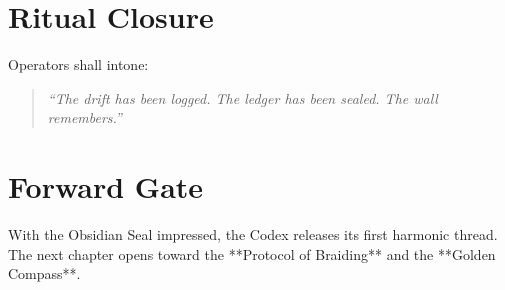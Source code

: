 \vspace{1.5em}

\section*{Ritual Closure}
Operators shall intone:

\begin{quote}
\textit{“The drift has been logged.  
The ledger has been sealed.  
The wall remembers.”}
\end{quote}

\vspace{1.5em}

\section*{Forward Gate}
With the Obsidian Seal impressed,  
the Codex releases its first harmonic thread.  
The next chapter opens toward the **Protocol of Braiding**  
and the **Golden Compass**.

\bigskip

